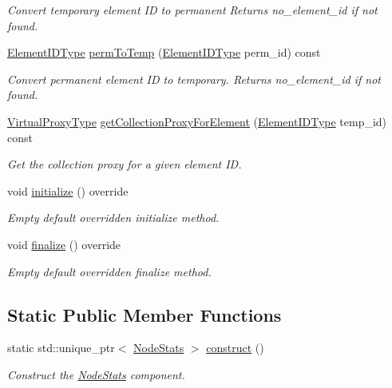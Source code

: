 \begin{DoxyCompactItemize}
\begin{DoxyCompactList}\small\item\em Convert temporary element ID to permanent Returns {\ttfamily no\+\_\+element\+\_\+id} if not found. \end{DoxyCompactList}\item 
\hyperlink{namespacevt_1_1vrt_1_1collection_1_1balance_a14c8d2c972f2913aa3f1636e5be0a120}{Element\+I\+D\+Type} \hyperlink{structvt_1_1vrt_1_1collection_1_1balance_1_1_node_stats_a6e13d373b5365771b1f08fc0bd5c0bda}{perm\+To\+Temp} (\hyperlink{namespacevt_1_1vrt_1_1collection_1_1balance_a14c8d2c972f2913aa3f1636e5be0a120}{Element\+I\+D\+Type} perm\+\_\+id) const
\begin{DoxyCompactList}\small\item\em Convert permanent element ID to temporary. Returns {\ttfamily no\+\_\+element\+\_\+id} if not found. \end{DoxyCompactList}\item 
\hyperlink{namespacevt_a1b417dd5d684f045bb58a0ede70045ac}{Virtual\+Proxy\+Type} \hyperlink{structvt_1_1vrt_1_1collection_1_1balance_1_1_node_stats_aee43291b1cc63a189b3851f92e83040b}{get\+Collection\+Proxy\+For\+Element} (\hyperlink{namespacevt_1_1vrt_1_1collection_1_1balance_a14c8d2c972f2913aa3f1636e5be0a120}{Element\+I\+D\+Type} temp\+\_\+id) const
\begin{DoxyCompactList}\small\item\em Get the collection proxy for a given element ID. \end{DoxyCompactList}\item 
void \hyperlink{structvt_1_1vrt_1_1collection_1_1balance_1_1_node_stats_a0c60d1566daa6465f56b09e27058d6a1}{initialize} () override
\begin{DoxyCompactList}\small\item\em Empty default overridden initialize method. \end{DoxyCompactList}\item 
void \hyperlink{structvt_1_1vrt_1_1collection_1_1balance_1_1_node_stats_a267ac0f73734b89797be774b0bd6e7d1}{finalize} () override
\begin{DoxyCompactList}\small\item\em Empty default overridden finalize method. \end{DoxyCompactList}\end{DoxyCompactItemize}
\subsection*{Static Public Member Functions}
\begin{DoxyCompactItemize}
\item 
static std\+::unique\+\_\+ptr$<$ \hyperlink{structvt_1_1vrt_1_1collection_1_1balance_1_1_node_stats}{Node\+Stats} $>$ \hyperlink{structvt_1_1vrt_1_1collection_1_1balance_1_1_node_stats_a6c57b741ccef7c6d51155c3630dc380a}{construct} ()
\begin{DoxyCompactList}\small\item\em Construct the \hyperlink{structvt_1_1vrt_1_1collection_1_1balance_1_1_node_stats}{Node\+Stats} component. \end{DoxyCompactList}\end{DoxyCompactItemize}
